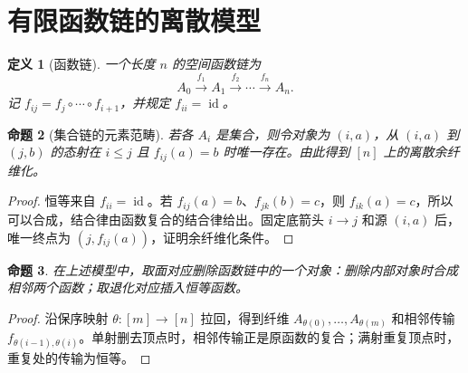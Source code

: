 \documentclass[12pt,oneside,openany,fontset=none]{ctexbook}
\theoremstyle{cn}
\newtheorem{definition}{定义}[chapter]
\newtheorem{proposition}[definition]{命题}
\numberwithin{equation}{chapter}
\newcommand{\id}{\operatorname{id}}
\begin{document}
\section{有限函数链的离散模型}
\begin{definition}[函数链]
一个长度 $n$ 的空间函数链为
\[
A_0\xrightarrow{f_1}A_1\xrightarrow{f_2}\cdots
\xrightarrow{f_n}A_n.
\]
记 $f_{ij}=f_j\circ\cdots\circ f_{i+1}$，并规定 $f_{ii}=\id$。
\end{definition}
\begin{proposition}[集合链的元素范畴]
若各 $A_i$ 是集合，则令对象为 $(i,a)$，从 $(i,a)$ 到 $(j,b)$ 的态射在 $i\le j$ 且 $f_{ij}(a)=b$ 时唯一存在。由此得到 $[n]$ 上的离散余纤维化。
\end{proposition}
\begin{proof}
恒等来自 $f_{ii}=\id$。若 $f_{ij}(a)=b$、$f_{jk}(b)=c$，则 $f_{ik}(a)=c$，所以可以合成，结合律由函数复合的结合律给出。固定底箭头 $i\to j$ 和源 $(i,a)$ 后，唯一终点为 $(j,f_{ij}(a))$，证明余纤维化条件。
\end{proof}
\begin{proposition}
在上述模型中，取面对应删除函数链中的一个对象：删除内部对象时合成相邻两个函数；取退化对应插入恒等函数。
\end{proposition}
\begin{proof}
沿保序映射 $\theta:[m]\to[n]$ 拉回，得到纤维 $A_{\theta(0)},\ldots,A_{\theta(m)}$ 和相邻传输 $f_{\theta(i-1),\theta(i)}$。单射删去顶点时，相邻传输正是原函数的复合；满射重复顶点时，重复处的传输为恒等。
\end{proof}
\end{document}
